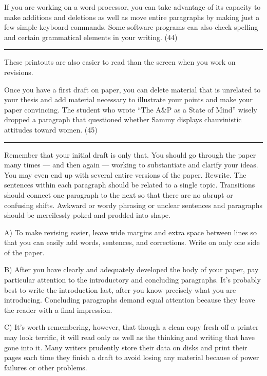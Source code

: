 \documentclass[UTF8,11pt]{ctexart}
\begin{document}
If you are working on a word processor, you can take advantage of its capacity to make additions and deletions as well as move entire paragraphs by making just a few simple keyboard commands. Some software programs can also check spelling and certain grammatical elements in your writing. (44)\par\noindent\rule{.95\linewidth}{.4pt}\par  These printouts are also easier to read than the screen when you work on revisions.


Once you have a first draft on paper, you can delete material that is unrelated to your thesis and add material necessary to illustrate your points and make your paper convincing. The student who wrote “The A\&P as a State of Mind” wisely dropped a paragraph that questioned whether Sammy displays chauvinistic attitudes toward women. (45)\par\noindent\rule{.95\linewidth}{.4pt}\par


Remember that your initial draft is only that. You should go through the paper many times — and then again — working to substantiate and clarify your ideas. You may even end up with several entire versions of the paper. Rewrite. The sentences within each paragraph should be related to a single topic. Transitions should connect one paragraph to the next so that there are no abrupt or confusing shifts. Awkward or wordy phrasing or unclear sentences and paragraphs should be mercilessly poked and prodded into shape.


A) To make revising easier, leave wide margins and extra space between lines so that you can easily add words, sentences, and corrections. Write on only one side of the paper.


B) After you have clearly and adequately developed the body of your paper, pay particular attention to the introductory and concluding paragraphs. It’s probably best to write the introduction last, after you know precisely what you are introducing. Concluding paragraphs demand equal attention because they leave the reader with a final impression.


C) It’s worth remembering, however, that though a clean copy fresh off a printer may look terrific, it will read only as well as the thinking and writing that have gone into it. Many writers prudently store their data on disks and print their pages each time they finish a draft to avoid losing any material because of power failures or other problems.
\end{document}
